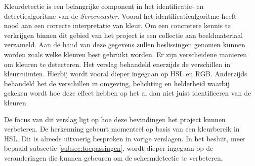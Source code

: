 
Kleurdetectie is een belangrijke component in het identificatie- en detectiealgoritme van de {\it Screencaster}. Vooral het identificatiealgoritme heeft nood aan een correcte interpretatie van kleur. Om een concretere kennis te verkrijgen binnen dit gebied van het project is een collectie aan beeldmateriaal verzameld. Aan de hand van deze gegevens zullen beslissingen genomen kunnen worden zoals welke kleuren best gebruikt worden. Er zijn verscheidene manieren om kleuren te detecteren. Het verslag behandeld enerzijds de verschillen in kleurruimten. Hierbij wordt vooral dieper ingegaan op HSL en RGB. Anderzijds behandeld het de verschillen in omgeving, belichting en helderheid waarbij gekeken wordt hoe deze effect hebben op het al dan niet juist identificeren van de kleuren.

De focus van dit verslag ligt op hoe deze bevindingen het project kunnen verbeteren. De herkenning gebeurt momenteel op basis van een kleurbereik in HSL. Dit is alreeds uitvoerig besproken in vorige verslagen. In het besluit, meer bepaald subsectie \ref{subsec:toepassingen}, wordt dieper ingegaan op de veranderingen die kunnen gebeuren om de schermdetectie te verbeteren.